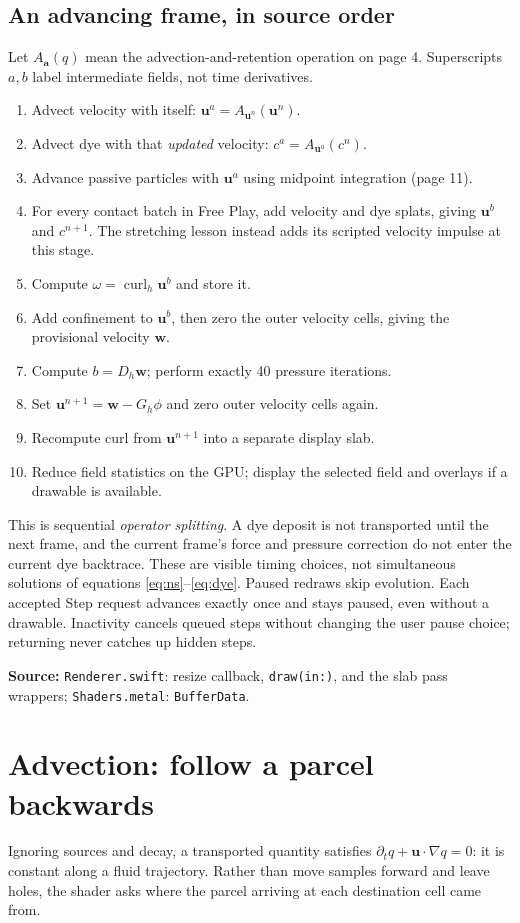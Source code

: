 \documentclass[11pt,a4paper]{article}
\newcommand{\uvec}{\mathbf{u}}
\newcommand{\src}[1]{\par{\footnotesize\raggedright\color{teal}\textbf{Source:} #1\par}}
\newcommand{\code}[1]{\texttt{#1}}
\newcommand{\page}[1]{\clearpage\section{#1}}
\begin{document}
\subsection*{An advancing frame, in source order}
Let $A_{\mathbf a}(q)$ mean the advection-and-retention operation on page 4.
Superscripts $a,b$ label intermediate fields, not time derivatives.
\begin{enumerate}
\item Advect velocity with itself: $\uvec^a=A_{\uvec^n}(\uvec^n)$.
\item Advect dye with that \emph{updated} velocity: $c^a=A_{\uvec^a}(c^n)$.
\item Advance passive particles with $\uvec^a$ using midpoint integration (page 11).
\item For every contact batch in Free Play, add velocity and dye splats, giving
$\uvec^b$ and $c^{n+1}$. The stretching lesson instead adds its scripted velocity impulse at this stage.
\item Compute $\omega=\operatorname{curl}_h\uvec^b$ and store it.
\item Add confinement to $\uvec^b$, then zero the outer velocity cells,
giving the provisional velocity $\mathbf w$.
\item Compute $b=D_h\mathbf w$; perform exactly 40 pressure iterations.
\item Set $\uvec^{n+1}=\mathbf w-G_h\phi$ and zero outer velocity cells again.
\item Recompute curl from $\uvec^{n+1}$ into a separate display slab.
\item Reduce field statistics on the GPU; display the selected field and overlays if a drawable is available.
\end{enumerate}

This is sequential \emph{operator splitting}. A dye deposit is not transported
until the next frame, and the current frame's force and pressure correction do
not enter the current dye backtrace. These are visible timing choices, not
simultaneous solutions of equations \eqref{eq:ns}--\eqref{eq:dye}.
Paused redraws skip evolution. Each accepted Step request advances exactly once and stays paused, even without a drawable. Inactivity cancels queued steps without changing the user pause choice; returning never catches up hidden steps.
\src{\code{Renderer.swift}: resize callback, \code{draw(in:)}, and the slab
pass wrappers; \code{Shaders.metal}: \code{BufferData}.}

\endgroup
\page{Advection: follow a parcel backwards}
Ignoring sources and decay, a transported quantity satisfies
$\partial_tq+\uvec\cdot\nabla q=0$: it is constant along a fluid trajectory.
Rather than move samples forward and leave holes, the shader asks where the
parcel arriving at each destination cell came from.
\end{document}
